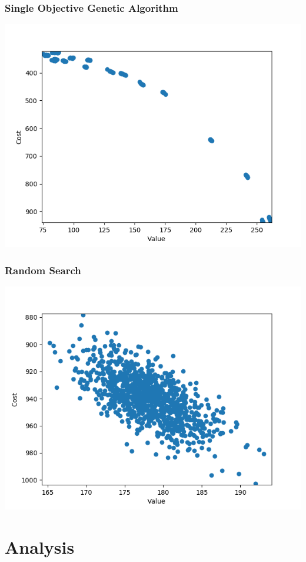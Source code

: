 \documentclass[12pt]{article}
\begin{document}
\subsubsection{Single Objective Genetic Algorithm}
\includegraphics[width=\linewidth]{res/single_obj_real.png}

\subsubsection{Random Search}
\includegraphics[width=\linewidth]{res/random_real.png}


\section{Analysis}
\end{document}
